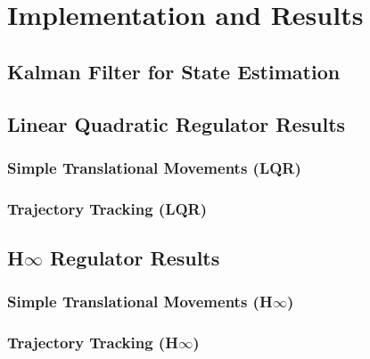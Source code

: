 \chapter{Implementation and Results} \label{ch:implementation}

\section{Kalman Filter for State Estimation}

\section{Linear Quadratic Regulator Results}


\subsection{Simple Translational Movements (LQR)}

\subsection{Trajectory Tracking (LQR)}


\section{H$\infty$ Regulator Results}


\subsection{Simple Translational Movements (H$\infty$)}

\subsection{Trajectory Tracking (H$\infty$)}
